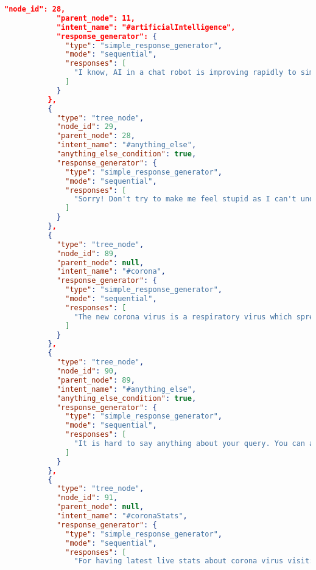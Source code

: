 \begin{appendix}
\begin{lstlisting}[language=json, firstnumber=1]
            "node_id": 28,
            "parent_node": 11,
            "intent_name": "#artificialIntelligence",
            "response_generator": {
              "type": "simple_response_generator",
              "mode": "sequential",
              "responses": [
                "I know, AI in a chat robot is improving rapidly to simulate the conversation or chat of a human being. Its hard to answer your question for now."
              ]
            }
          },
          {
            "type": "tree_node",
            "node_id": 29,
            "parent_node": 28,
            "intent_name": "#anything_else",
            "anything_else_condition": true,
            "response_generator": {
              "type": "simple_response_generator",
              "mode": "sequential",
              "responses": [
                "Sorry! Don't try to make me feel stupid as I can't understand it. I will be able to reply once my developer will feed me with more training data."
              ]
            }
          },
          {
            "type": "tree_node",
            "node_id": 89,
            "parent_node": null,
            "intent_name": "#corona",
            "response_generator": {
              "type": "simple_response_generator",
              "mode": "sequential",
              "responses": [
                "The new corona virus is a respiratory virus which spreads primarily through droplets generated when an infected person coughs or sneezes, or through droplets of saliva or discharge from the nose. To protect yourself, clean your hands frequently with an alcohol-based hand rub or wash them with soap and water. Also I would recommend to stay home and stay safe."
              ]
            }
          },
          {
            "type": "tree_node",
            "node_id": 90,
            "parent_node": 89,
            "intent_name": "#anything_else",
            "anything_else_condition": true,
            "response_generator": {
              "type": "simple_response_generator",
              "mode": "sequential",
              "responses": [
                "It is hard to say anything about your query. You can ask me about its precautionary measures."
              ]
            }
          },
          {
            "type": "tree_node",
            "node_id": 91,
            "parent_node": null,
            "intent_name": "#coronaStats",
            "response_generator": {
              "type": "simple_response_generator",
              "mode": "sequential",
              "responses": [
                "For having latest live stats about corona virus visit: https://www.worldometers.info/coronavirus/"

\end{lstlisting}
\end{appendix}

